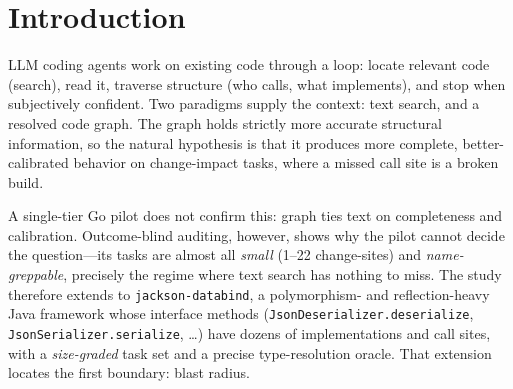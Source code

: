 \documentclass[11pt]{article}
\newcommand{\code}[1]{\texttt{#1}}
\begin{document}
\begin{abstract}
Applying each answer as edits and compiling converts the recall gap into
build outcomes: across 162 runs, every answer that missed a site failed to
compile and every complete answer compiled; the smallest tier on text search
produced no compiling build (0/16), while its task-altitude failures reduce
to a single shared two-error engine residual.
Building the deterministic operation also surfaced latent resolution defects
that every LLM-orchestrated arm had silently absorbed---five in the initial
Java build, and independently in Go a missing response-schema entry that made
the task-altitude operation lose to text (mean recall $0.935$) until fixed,
after which every tier reached $1.000$; a traversal that lives in a tool can be
regression-tested in a way that a traversal buried in an agent loop cannot.
We give the mechanism and the boundary it predicts: task-shaped operations
outperform primitive kits on completeness-critical traversals, and any
comparison of context paradigms that fixes the interface silently conflates
two independent variables.
\end{abstract}

\section{Introduction}
\label{sec:intro}

LLM coding agents work on existing code through a loop: locate relevant code
(search), read it, traverse structure (who calls, what implements), and stop
when subjectively confident. Two paradigms supply
the context: text search, and a resolved code graph. The graph holds strictly
more accurate structural information, so the natural hypothesis is that it
produces more complete, better-calibrated behavior on change-impact tasks, where
a missed call site is a broken build.

A single-tier Go pilot does not confirm this: graph ties text on completeness
and calibration. Outcome-blind auditing, however, shows why the pilot cannot
decide the question---its tasks are almost all \emph{small} (1--22
change-sites) and \emph{name-greppable}, precisely the regime where text
search has nothing to miss. The study therefore extends to
\code{jackson-databind}, a polymorphism- and reflection-heavy Java framework
whose interface methods (\code{JsonDeserializer.deserialize},
\code{JsonSerializer.serialize}, \ldots) have dozens of implementations and
call sites, with a \emph{size-graded} task set and a precise type-resolution
oracle. That extension locates the first boundary: blast radius.
\end{document}

